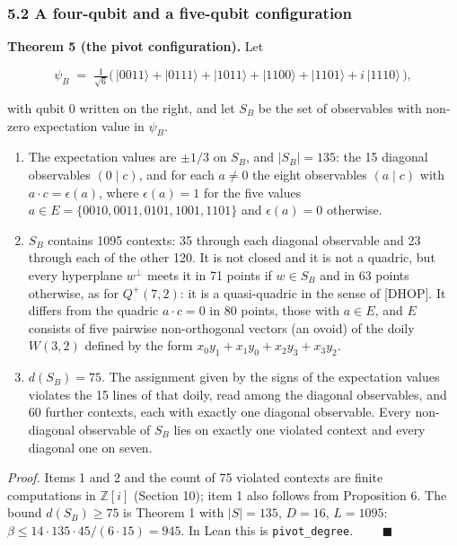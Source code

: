 \documentclass[11pt,a4paper]{article}
\providecommand{\tightlist}{\setlength{\itemsep}{0pt}\setlength{\parskip}{0pt}}
\begin{document}
\subsubsection{5.2 A four-qubit and a five-qubit configuration}\label{52-a-four-qubit-and-a-five-qubit-configuration}

\textbf{Theorem 5 (the pivot configuration).} Let

\[\psi_B \;=\; \tfrac{1}{\sqrt6}\big(\,|0011\rangle + |0111\rangle + |1011\rangle + |1100\rangle + |1101\rangle + i\,|1110\rangle\,\big),\]

with qubit 0 written on the right, and let \(S_B\) be the set of observables with non-zero expectation
value in \(\psi_B\).

\begin{enumerate}
\def\labelenumi{\arabic{enumi}.}
\tightlist
\item
  The expectation values are \(\pm 1/3\) on \(S_B\), and \(|S_B| = 135\): the 15 diagonal observables
  \((0 \mid c)\), and for each \(a \ne 0\) the eight observables \((a \mid c)\) with \(a \cdot c = \epsilon(a)\), where
  \(\epsilon(a) = 1\) for the five values \(a \in E = \{0010, 0011, 0101, 1001, 1101\}\) and \(\epsilon(a) = 0\)
  otherwise.
\item
  \(S_B\) contains 1095 contexts: 35 through each diagonal observable and 23 through each of the other
  120. It is not closed and it is not a quadric, but every hyperplane \(w^\perp\) meets it in 71 points if
  \(w \in S_B\) and in 63 points otherwise, as for \(Q^+(7,2)\): it is a quasi-quadric in the sense of
  {[}DHOP{]}. It differs from the quadric \(a \cdot c = 0\) in 80 points, those with \(a \in E\), and \(E\)
  consists of five pairwise non-orthogonal vectors (an ovoid) of the doily \(W(3,2)\) defined by the form
  \(x_0y_1 + x_1y_0 + x_2y_3 + x_3y_2\).
\item
  \(d(S_B) = 75\). The assignment given by the signs of the expectation values violates the 15 lines of
  that doily, read among the diagonal observables, and 60 further contexts, each with exactly one
  diagonal observable. Every non-diagonal observable of \(S_B\) lies on exactly one violated context and
  every diagonal one on seven.
\end{enumerate}

\emph{Proof.} Items 1 and 2 and the count of 75 violated contexts are finite computations in \(\mathbb{Z}[i]\)
(Section 10); item 1 also follows from Proposition 6. The bound \(d(S_B) \ge 75\) is Theorem 1 with
\(|S| = 135\), \(D = 16\), \(L = 1095\): \(\beta \le 14 \cdot 135 \cdot 45 / (6 \cdot 15) = 945\). In Lean this
is \texttt{pivot\_degree}. \(\qquad\blacksquare\)
\end{document}
